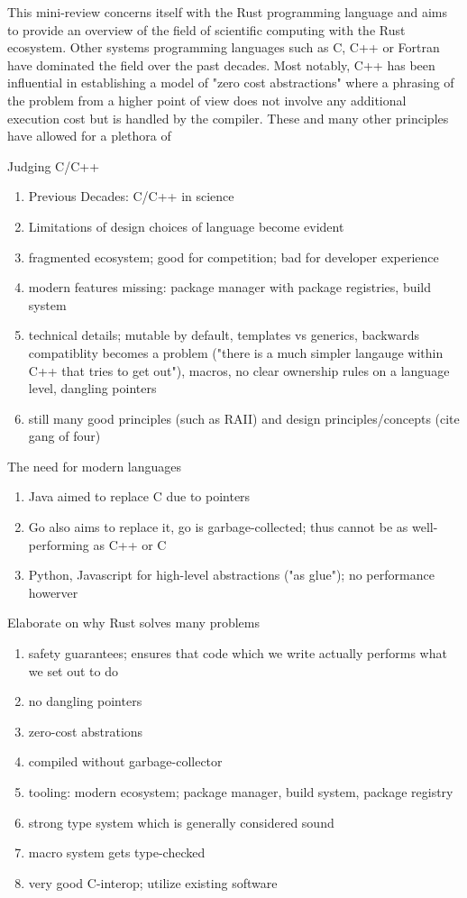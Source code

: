 \documentclass{article}
\begin{document}
This mini-review concerns itself with the Rust programming language and aims to provide an overview
of the field of scientific computing with the Rust ecosystem.
Other systems programming languages  such as C, C++ or Fortran have dominated the field over the
past decades.
Most notably, C++ has been influential in establishing a model of "zero cost abstractions" where a
phrasing of the problem from a higher point of view does not involve any additional execution cost
but is handled by the compiler.
These and many other principles have allowed for a plethora of

Judging C/C++
\begin{enumerate}
    \item Previous Decades: C/C++ in science
    \item Limitations of design choices of language become evident
    \item fragmented ecosystem; good for competition; bad for developer experience
    \item modern features missing: package manager with package registries, build system
    \item technical details; mutable by default, templates vs generics, backwards
        compatiblity becomes a
        problem ("there is a much simpler langauge within C++ that tries to get out"),
        macros, no clear
        ownership rules on a language level, dangling pointers
    \item still many good principles (such as RAII) and design principles/concepts (cite
        gang of four)
\end{enumerate}

The need for modern languages
\begin{enumerate}
    \item Java aimed to replace C due to pointers
    \item Go also aims to replace it, go is garbage-collected; thus cannot be as
        well-performing as C++ or C
    \item Python, Javascript for high-level abstractions ("as glue"); no performance howerver
\end{enumerate}

Elaborate on why Rust solves many problems
\begin{enumerate}
    \item safety guarantees; ensures that code which we write actually performs what we
        set out to do
    \item no dangling pointers
    \item zero-cost abstrations
    \item compiled without garbage-collector
    \item tooling: modern ecosystem; package manager, build system, package registry
    \item strong type system which is generally considered sound
    \item macro system gets type-checked
    \item very good C-interop; utilize existing software
\end{enumerate}
\end{document}
